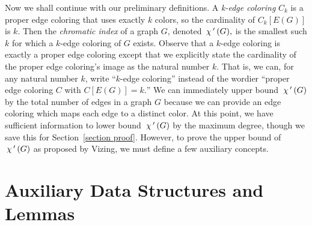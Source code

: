 Now we shall continue with our preliminary definitions. A \textit{k-edge coloring} $C_k$ is a proper edge coloring that uses exactly $k$ colors, so the cardinality of $C_k[E(G)]$ is $k.$ Then the \textit{chromatic index} of a graph $G$, denoted $\,\chi\,'\,(G),$ is the smallest such $k$ for which a $k$-edge coloring of $G$ exists. Observe that a $k$-edge coloring is exactly a proper edge coloring except that we explicitly state the cardinality of the proper edge coloring's image as the natural number $k.$ That is, we can, for any natural number $k$, write ``$k$-edge coloring'' instead of the wordier ``proper edge coloring $C$ with $C[E(G)] = k.$''  We can immediately upper bound $\,\chi\,'\,(G)$ by the total number of edges in a graph $G$ because we can provide an edge coloring which maps each edge to a distinct color. At this point, we have sufficient information to lower bound $\,\chi\,'\,(G)$ by the maximum degree, though we save this for Section~\ref{section proof}. However, to prove the upper bound of $\,\chi\,'\,(G)$ as proposed by Vizing, we must define a few auxiliary concepts.

\section{Auxiliary Data Structures and Lemmas}\label{section math aux}
